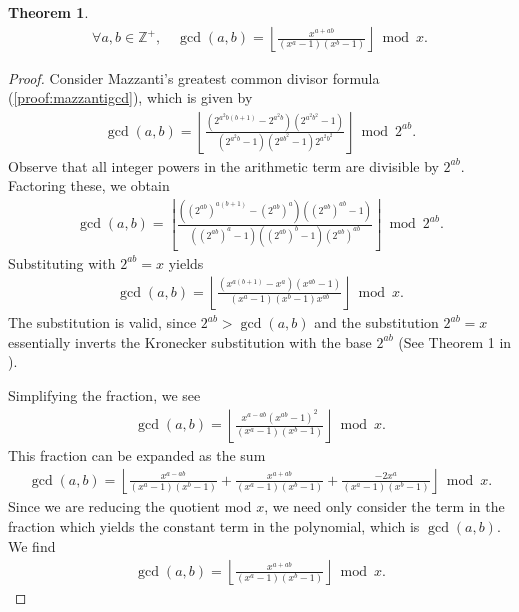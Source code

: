 \documentclass[11pt,reqno]{article}
\theoremstyle{plain}
\newtheorem{theorem}{Theorem}
\theoremstyle{definition}
\newcommand{\floor}[1]{\left\lfloor #1 \right\rfloor}
\newcommand{\Z}{\mathbb{Z}}
\begin{document}
\begin{theorem} \label{proof:gcdpolynomial}
\begin{align*}
\forall a,b \in \Z^+, \quad
\gcd(a,b) = \floor{\frac{x^{a+ab}}{(x^a - 1)(x^b-1)}}\bmod x .
\end{align*}
\end{theorem}
\begin{proof}
Consider Mazzanti's greatest common divisor formula (\cref{proof:mazzantigcd}), which is given by
\begin{align*}
\gcd(a,b) = \floor{\frac{(2^{a^2 b(b+1)} - 2^{a^2 b}) (2^{a^2 b^2} - 1)}
         {(2^{a^2 b} - 1)(2^{ab^2}-1)2^{a^2 b^2}}} \bmod 2^{ab}.
\end{align*}
Observe that all integer powers in the arithmetic term are divisible by $2^{ab}$. Factoring these, we obtain
\begin{align*}
\gcd(a,b) = \floor{\frac{((2^{ab})^{a (b+1)} - (2^{ab})^a) ((2^{ab})^{ab} - 1)}
 {((2^{ab})^{a} - 1)((2^{ab})^{b}-1) (2^{ab})^{ab}}} \bmod 2^{ab} .
\end{align*}
Substituting with $2^{ab} = x$ yields
\begin{align*}
\gcd(a,b) = \floor{\frac{(x^{a (b+1)} - x^a) (x^{ab} - 1)}
 {(x^{a} - 1)(x^{b}-1) x^{ab}}} \bmod x .
\end{align*}
The substitution is valid, since $2^{ab} > \gcd(a,b)$ and the substitution $2^{ab} = x$ essentially inverts the Kronecker substitution with the base $2^{ab}$ (See Theorem 1 in \cite{shunia2023simple}).

Simplifying the fraction, we see
\begin{align*}
\gcd(a,b) = \floor{
\frac
{ x^{a-ab} (x^{ab} - 1)^2 }
{ (x^a - 1)(x^b-1) }
}
 \bmod x .
\end{align*}
This fraction can be expanded as the sum
\begin{align*}
\gcd(a,b) = \floor{
    \frac
    { x^{a-ab} }
    { (x^a - 1)(x^b-1) }
    +
    \frac
    { x^{a+ab} }
    { (x^a - 1)(x^b-1) }
    +
    \frac
    { -2x^{a} }
    { (x^a - 1)(x^b-1) }
}
 \bmod x .
\end{align*}
Since we are reducing the quotient mod $x$, we need only consider the term in the fraction which yields the constant term in the polynomial, which is $\gcd(a,b)$. We find
\begin{align*}
\gcd(a,b) = \floor{\frac{x^{a+ab}}{(x^a-1)(x^b-1)}}\bmod x .
\end{align*}
\end{proof}
\end{document}
